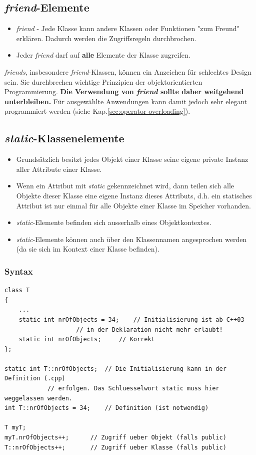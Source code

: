\subsection{\emph{friend}-Elemente}
\begin{itemize}
	\item \emph{friend} - Jede Klasse kann andere Klassen oder Funktionen "zum Freund" erklären. Dadurch werden die Zugriffsregeln durchbrochen.
	\item Jeder \emph{friend} darf auf \textbf{alle} Elemente der Klasse zugreifen.
\end{itemize}
\begin{achtung}
	\emph{friends}, insbesondere \emph{friend}-Klassen, können ein Anzeichen für schlechtes Design sein. Sie durchbrechen wichtige Prinzipien der objektorientierten Programmierung.
	\textbf{Die Verwendung von \emph{friend} sollte daher weitgehend unterbleiben.}
	Für ausgewählte Anwendungen kann damit jedoch sehr elegant programmiert werden (siehe Kap.\ref{sec:operator overloading}).
\end{achtung}

\subsection{\emph{static}-Klassenelemente}
\begin{itemize}
	\item Grundsätzlich besitzt jedes Objekt einer Klasse seine eigene private Instanz aller Attribute einer Klasse.
	\item Wenn ein Attribut mit \emph{static} gekennzeichnet wird, dann teilen sich alle Objekte dieser Klasse eine eigene Instanz dieses Attributs, d.h. ein statisches Attribut ist nur einmal für alle Objekte einer Klasse im Speicher vorhanden.
	\item \emph{static}-Elemente befinden sich ausserhalb eines Objektkontextes.
	\item \emph{static}-Elemente können auch über den Klassennamen angesprochen werden (da sie sich im Kontext einer Klasse befinden).
\end{itemize}

\subsubsection{Syntax}
\vspace{-\baselineskip}
\begin{minipage}{\linewidth}
\begin{lstlisting}
class T
{
	...
	static int nrOfObjects = 34;	// Initialisierung ist ab C++03
					// in der Deklaration nicht mehr erlaubt!
	static int nrOfObjects;		// Korrekt
};

static int T::nrOfObjects;	// Die Initialisierung kann in der Definition (.cpp)
			// erfolgen. Das Schluesselwort static muss hier weggelassen werden.
int T::nrOfObjects = 34;	// Definition (ist notwendig)

T myT;
myT.nrOfObjects++;		// Zugriff ueber Objekt (falls public)
T::nrOfObjects++;		// Zugriff ueber Klasse (falls public)
\end{lstlisting}
\end{minipage}

